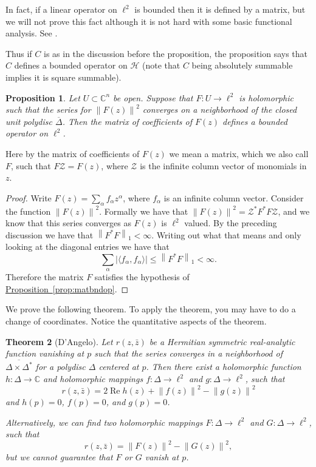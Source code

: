 \documentclass[12pt,openany]{book}
\renewcommand{\Re}{\operatorname{Re}}
\newcommand{\abs}[1]{\left\lvert {#1} \right\rvert}
\newcommand{\norm}[1]{\left\lVert {#1} \right\rVert}
\newcommand{\C}{{\mathbb{C}}}
\newcommand{\sH}{{\mathcal{H}}}
\newcommand{\sZ}{{\mathcal{Z}}}
\theoremstyle{plain}
\newtheorem{thm}{Theorem}[section]
\newtheorem{prop}[thm]{Proposition}
\theoremstyle{remark}
\theoremstyle{definition}
\theoremstyle{exercise}
\theoremstyle{example}
\newcommand{\propref}[1]{\hyperref[#1]{Proposition~\ref*{#1}}}
\begin{document}
In fact, if a linear operator on $\ell^2$ is bounded then it is defined by a
matrix, but we will not prove this fact although it is not hard with some
basic functional analysis.  See \cite{AG:linop}.

Thus if $C$ is as in the discussion before the proposition, the proposition
says that $C$ defines a bounded operator on $\sH$ (note that $C$ being
absolutely summable implies it is square summable).

\begin{prop}
Let $U \subset \C^n$ be open.
Suppose that $F \colon U \to \ell^2$ is holomorphic such that
the series for $\norm{F(z)}^2$ converges on a neighborhood of
the closed unit polydisc $\overline{\Delta}$.  Then the matrix of coefficients of $F(z)$
defines a bounded operator on $\ell^2$.
\end{prop}

Here by the matrix of coefficients of $F(z)$ we mean a matrix,
which we also call $F$,
such that $F \sZ = F(z)$, where $\sZ$ is the infinite column vector
of monomials in $z$.

\begin{proof}
Write $F(z) = \sum_\alpha f_\alpha z^\alpha$, where $f_\alpha$ is an infinite
column vector.  Consider the function
$\norm{F(z)}^2$.  Formally we have that
$\norm{F(z)}^2 = \sZ^* F^*F \sZ$, and we know that this series converges as
$F(z)$ is $\ell^2$ valued.
By the preceding discussion we have that $\norm{F^*F}_1 <
\infty$.  Writing out what that means and only looking at the diagonal
entries we have that
\begin{equation}
\sum_\alpha \abs{\langle f_\alpha, f_\alpha \rangle} \leq \norm{F^*F}_1 < \infty
.
\end{equation}
Therefore the matrix $F$ satisfies the hypothesis of \propref{prop:matbndop}.
\end{proof}

We prove the following theorem.
To apply the theorem, you may have to do a
change of coordinates.  Notice the quantitative aspects of the theorem.

\begin{thm}[D'Angelo]
Let $r(z,\bar{z})$ be a Hermitian symmetric real-analytic function 
vanishing at $p$
such that the series converges in a neighborhood of $\overline{\Delta \times
\Delta^*}$ for a polydisc $\Delta$ centered at $p$.
Then there exist
a holomorphic
function $h \colon \Delta \to \C$ and holomorphic mappings
$f \colon \Delta \to \ell^2$ and
$g \colon \Delta \to \ell^2$, such that
\begin{equation}
r(z,\bar{z}) = 2 \Re h(z) + \norm{f(z)}^2 - \norm{g(z)}^2
\end{equation}
and $h(p) = 0$, $f(p) = 0$, and $g(p) = 0$.

Alternatively, we can find two holomorphic mappings
$F \colon \Delta \to \ell^2$ and
$G \colon \Delta \to \ell^2$, such that
\begin{equation}
r(z,\bar{z}) = \norm{F(z)}^2 - \norm{G(z)}^2 ,
\end{equation}
but we cannot guarantee that $F$ or $G$ vanish at $p$.
\end{thm}
\end{document}
